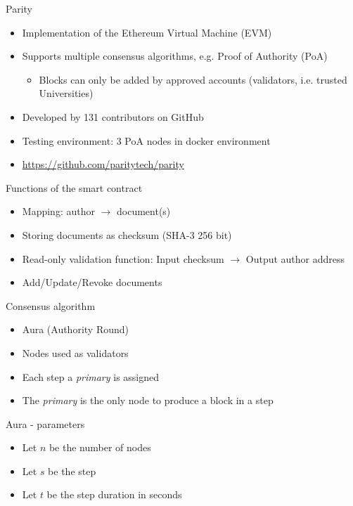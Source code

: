 \documentclass[10pt]{beamer}
\begin{document}
\begin{frame}{Parity}
	\begin{itemize}
		\item Implementation of the Ethereum Virtual Machine (EVM)
		\item Supports multiple consensus algorithms, e.g. Proof of Authority (PoA)
		\begin{itemize}
			\item Blocks can only be added by approved accounts (validators, i.e. trusted Universities)
		\end{itemize}
		\item Developed by 131 contributors on GitHub
		\item Testing environment: 3 PoA nodes in docker environment
		\item \url{https://github.com/paritytech/parity}
	\end{itemize}
\end{frame}

\begin{frame}{Functions of the smart contract}
	\begin{itemize}
		\item Mapping: author  $\rightarrow$ document(s)
		\item Storing documents as checksum (SHA-3 256 bit)
		\item Read-only validation function: Input checksum $\rightarrow$ Output author address
		\item Add/Update/Revoke documents
	\end{itemize}
\end{frame}

\begin{frame}{Consensus algorithm}
	\begin{itemize}
		\item Aura (Authority Round)
		\item Nodes used as validators
		\item Each step a \textit{primary} is assigned
		\item The \textit{primary} is the only node to produce a block in a step
	\end{itemize}
\end{frame}

\begin{frame}{Aura - parameters}
	\begin{itemize}
		\item Let $n$ be the number of nodes
		\item Let $s$ be the step
		\item Let $t$ be the step duration in seconds
	\end{itemize}
\end{frame}
\end{document}
